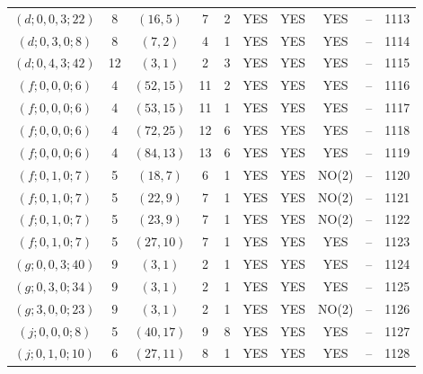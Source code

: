 \begin{longtable}{|c|c|c|c|c|c|c|c|c|c|}
$(d; 0, 0, 3; 22)$ & 8 & $(16, 5)$ & 7 & 2 & YES & YES & YES & -- & 1113\\
$(d; 0, 3, 0; 8)$ & 8 & $(7, 2)$ & 4 & 1 & YES & YES & YES & -- & 1114\\
$(d; 0, 4, 3; 42)$ & 12 & $(3, 1)$ & 2 & 3 & YES & YES & YES & -- & 1115\\
$(f; 0, 0, 0; 6)$ & 4 & $(52, 15)$ & 11 & 2 & YES & YES & YES & -- & 1116\\
$(f; 0, 0, 0; 6)$ & 4 & $(53, 15)$ & 11 & 1 & YES & YES & YES & -- & 1117\\
$(f; 0, 0, 0; 6)$ & 4 & $(72, 25)$ & 12 & 6 & YES & YES & YES & -- & 1118\\
$(f; 0, 0, 0; 6)$ & 4 & $(84, 13)$ & 13 & 6 & YES & YES & YES & -- & 1119\\
$(f; 0, 1, 0; 7)$ & 5 & $(18, 7)$ & 6 & 1 & YES & YES & NO(2) & -- & 1120\\
$(f; 0, 1, 0; 7)$ & 5 & $(22, 9)$ & 7 & 1 & YES & YES & NO(2) & -- & 1121\\
$(f; 0, 1, 0; 7)$ & 5 & $(23, 9)$ & 7 & 1 & YES & YES & NO(2) & -- & 1122\\
$(f; 0, 1, 0; 7)$ & 5 & $(27, 10)$ & 7 & 1 & YES & YES & YES & -- & 1123\\
$(g; 0, 0, 3; 40)$ & 9 & $(3, 1)$ & 2 & 1 & YES & YES & YES & -- & 1124\\
$(g; 0, 3, 0; 34)$ & 9 & $(3, 1)$ & 2 & 1 & YES & YES & YES & -- & 1125\\
$(g; 3, 0, 0; 23)$ & 9 & $(3, 1)$ & 2 & 1 & YES & YES & NO(2) & -- & 1126\\
$(j; 0, 0, 0; 8)$ & 5 & $(40, 17)$ & 9 & 8 & YES & YES & YES & -- & 1127\\
$(j; 0, 1, 0; 10)$ & 6 & $(27, 11)$ & 8 & 1 & YES & YES & YES & -- & 1128
\end{longtable}
